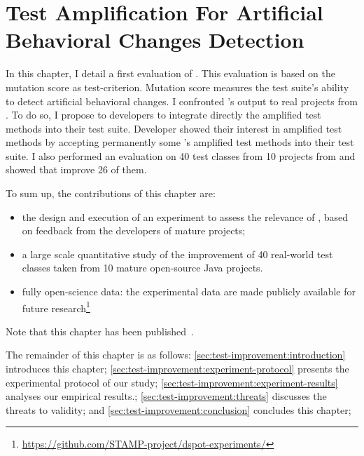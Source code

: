 \chapter{Test Amplification For Artificial Behavioral Changes Detection}
\label{chap:test-improvement}

\begin{chaptersummary}
	In this chapter, I detail a first evaluation of \dspot. 
	This evaluation is based on the mutation score as test-criterion.
	Mutation score measures the test suite's ability to detect artificial behavioral changes.
	I confronted \dspot's output to real projects from \gh.
	To do so, I propose to developers to integrate directly the amplified test methods into their test suite.
	Developer showed their interest in amplified test methods by accepting permanently some \dspot's amplified test methods into their test suite.
	I also performed an evaluation on 40 test classes from 10 projects from \gh and showed that \dspot improve 26 of them.
 
 	To sum up, the contributions of this chapter are:
	\begin{itemize}
		\item the design and execution of an experiment to assess the relevance of \dspot, based on feedback from the developers of mature projects;
		\item a large scale quantitative study of the improvement of 40 real-world test classes taken from 10 mature open-source Java projects.	
		\item fully open-science data: the experimental data are made publicly available for future research\footnote{\url{https://github.com/STAMP-project/dspot-experiments/}}
	\end{itemize}
	Note that this chapter has been published~\cite{Danglot2019}.
	
	The remainder of this chapter is as follows:
	\autoref{sec:test-improvement:introduction} introduces this chapter;
	\autoref{sec:test-improvement:experiment-protocol} presents the experimental protocol of our study;
	\autoref{sec:test-improvement:experiment-results} analyses our empirical results.;
	\autoref{sec:test-improvement:threats} discusses the threats to validity;
	and \autoref{sec:test-improvement:conclusion} concludes this chapter;
\end{chaptersummary}

\minitoc

\graphicspath{{.}{chapitres/test-improvement/}}

